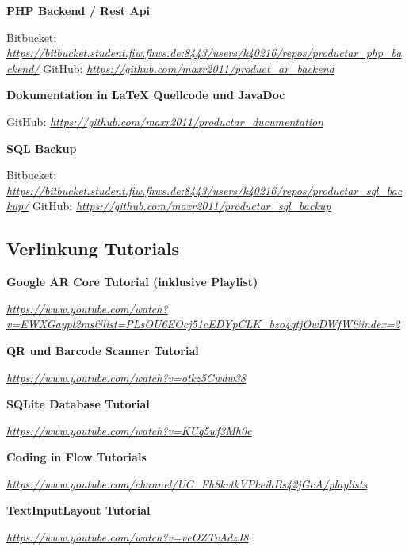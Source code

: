 \documentclass{scrartcl}
\begin{document}
\noindent \textbf{PHP Backend / Rest Api}

\noindent Bitbucket: \textit{\url{https://bitbucket.student.fiw.fhws.de:8443/users/k40216/repos/productar_php_backend/} \newline}
\noindent GitHub: \textit{\url{https://github.com/maxr2011/product_ar_backend} \newline}

\noindent \textbf{Dokumentation in LaTeX Quellcode und JavaDoc}

\noindent GitHub: \textit{\url{https://github.com/maxr2011/productar_ducumentation} \newline}

\noindent \textbf{SQL Backup}

\noindent Bitbucket: \textit{\url{https://bitbucket.student.fiw.fhws.de:8443/users/k40216/repos/productar_sql_backup/} \newline}
\noindent GitHub: \textit{\url{https://github.com/maxr2011/productar_sql_backup} \newline}

\newpage

\subsection{Verlinkung Tutorials}

\noindent \textbf{Google AR Core Tutorial (inklusive Playlist)}

\noindent \textit{\url{https://www.youtube.com/watch?v=EWXGaypl2ms\&list=PLsOU6EOcj51cEDYpCLK\_bzo4qtjOwDWfW\&index=2} \newline}

\noindent \textbf{QR und Barcode Scanner Tutorial}

\noindent \textit{\url{https://www.youtube.com/watch?v=otkz5Cwdw38} \newline}

\noindent \textbf{SQLite Database Tutorial}

\noindent \textit{\url{https://www.youtube.com/watch?v=KUq5wf3Mh0c} \newline}

\noindent \textbf{Coding in Flow Tutorials}

\noindent \textit{\url{https://www.youtube.com/channel/UC_Fh8kvtkVPkeihBs42jGcA/playlists} \newline}

\noindent \textbf{TextInputLayout Tutorial}

\noindent \textit{\url{https://www.youtube.com/watch?v=veOZTvAdzJ8} \newline}
\end{document}
